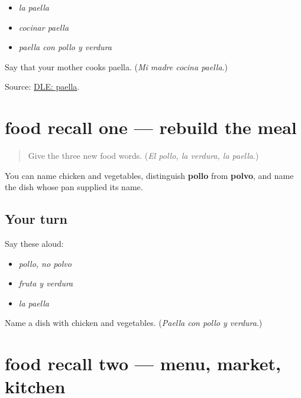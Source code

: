 \begin{itemize}
\raggedright
  \item \emph{la paella}
  \item \emph{cocinar paella}
  \item \emph{paella con pollo y verdura}
\end{itemize}

\begin{tcolorbox}[breakable,colback=teal!4,colframe=teal!35!black,title={Before you move on}]
Say that your mother cooks paella. (\emph{Mi madre cocina paella}.)

Source: \href{https://dle.rae.es/paella}{DLE: paella}.
\end{tcolorbox}
\section[(review)]{food recall one — rebuild the meal}

\label{lesson:ES-C403-food-recall-1}



\begin{quote}
Give the three new food words. (\emph{El pollo, la verdura, la paella}.)
\end{quote}

\begin{grammarlens}[title={What you've built}]
You can name chicken and vegetables, distinguish \textbf{pollo} from \textbf{polvo}, and name the dish whose pan supplied its name.
\end{grammarlens}

\subsection*{Your turn}
Say these aloud:

\begin{itemize}
\raggedright
  \item \emph{pollo, no polvo}
  \item \emph{fruta y verdura}
  \item \emph{la paella}
\end{itemize}

\begin{tcolorbox}[breakable,colback=teal!4,colframe=teal!35!black,title={Before you move on}]
Name a dish with chicken and vegetables. (\emph{Paella con pollo y verdura}.)
\end{tcolorbox}
\section[(review)]{food recall two — menu, market, kitchen}

